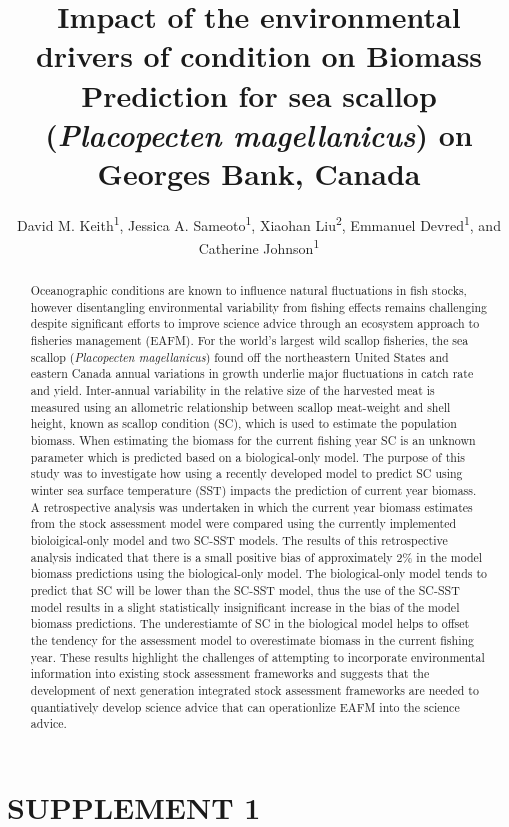 \documentclass[
]{article}
\title{Impact of the environmental drivers of condition on Biomass Prediction for sea scallop (\emph{Placopecten magellanicus}) on Georges Bank, Canada}
\author{David M. Keith\textsuperscript{1},
Jessica A. Sameoto\textsuperscript{1},
Xiaohan Liu\textsuperscript{2},
Emmanuel Devred\textsuperscript{1}, and
Catherine Johnson\textsuperscript{1}}
\date{}
\begin{document}
\maketitle
\begin{abstract}
Oceanographic conditions are known to influence natural fluctuations in fish stocks, however disentangling environmental variability from fishing effects remains challenging despite significant efforts to improve science advice through an ecosystem approach to fisheries management (EAFM). For the world's largest wild scallop fisheries, the sea scallop (\emph{Placopecten magellanicus}) found off the northeastern United States and eastern Canada annual variations in growth underlie major fluctuations in catch rate and yield. Inter-annual variability in the relative size of the harvested meat is measured using an allometric relationship between scallop meat-weight and shell height, known as scallop condition (SC), which is used to estimate the population biomass. When estimating the biomass for the current fishing year SC is an unknown parameter which is predicted based on a biological-only model. The purpose of this study was to investigate how using a recently developed model to predict SC using winter sea surface temperature (SST) impacts the prediction of current year biomass. A retrospective analysis was undertaken in which the current year biomass estimates from the stock assessment model were compared using the currently implemented bioloigical-only model and two SC-SST models. The results of this retrospective analysis indicated that there is a small positive bias of approximately 2\% in the model biomass predictions using the biological-only model. The biological-only model tends to predict that SC will be lower than the SC-SST model, thus the use of the SC-SST model results in a slight statistically insignificant increase in the bias of the model biomass predictions. The underestiamte of SC in the biological model helps to offset the tendency for the assessment model to overestimate biomass in the current fishing year. These results highlight the challenges of attempting to incorporate environmental information into existing stock assessment frameworks and suggests that the development of next generation integrated stock assessment frameworks are needed to quantiatively develop science advice that can operationlize EAFM into the science advice.
\end{abstract}

\newpage

\hypertarget{ref-sup}{%
\section{SUPPLEMENT 1}\label{ref-sup}}
\end{document}
